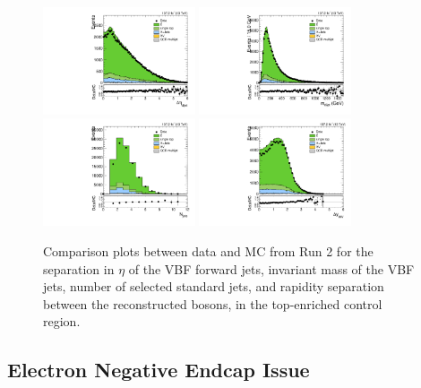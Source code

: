\begin{figure}[htbp]
  \centering
  \includegraphics[width=0.4\textwidth]{fig/analysis/CR_b1_allL_allP_allC_allE_Run2_lnujj_vbfDEta.pdf}
  \includegraphics[width=0.4\textwidth]{fig/analysis/CR_b1_allL_allP_allC_allE_Run2_lnujj_vbfMass.pdf}\\
  \includegraphics[width=0.4\textwidth]{fig/analysis/CR_b1_allL_allP_allC_allE_Run2_lnujj_nJets.pdf}
  \includegraphics[width=0.4\textwidth]{fig/analysis/CR_b1_allL_allP_allC_allE_Run2_dy.pdf}\\
  \caption{
    Comparison plots between data and MC from Run 2 for the separation in $\eta$ of the VBF forward jets, invariant mass of the VBF jets, number of selected standard jets, and rapidity separation between the reconstructed bosons, in the top-enriched control region.
  }
  \label{fig:CR_controlPlotsRun2_4}
\end{figure}

\subsection{Electron Negative Endcap Issue}

